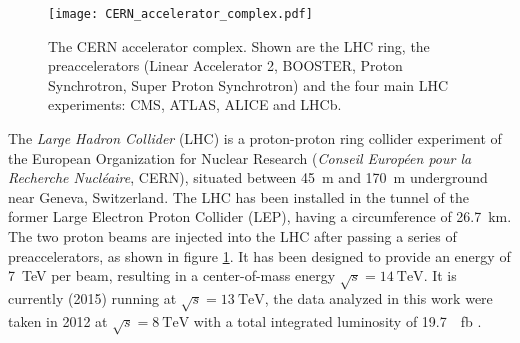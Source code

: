 \begin{figure}
	\centering
	\texttt{[image: CERN\_accelerator\_complex.pdf]}
	\caption{The CERN accelerator complex\cite[modified]{Marcastel2013CERNs}. Shown are the LHC ring, the preaccelerators (Linear Accelerator 2, BOOSTER, Proton Synchrotron, Super Proton Synchrotron) and the four main LHC experiments: CMS, ATLAS, ALICE and LHCb.}
	\label{fig:cern_accelerator_complex}
\end{figure}

The \emph{Large Hadron Collider} (LHC) is a proton-proton ring collider experiment of the European Organization for Nuclear Research (\emph{Conseil Européen pour la Recherche Nucléaire}, CERN), situated between \SI{45}{\meter} and \SI{170}{\meter} underground near Geneva, Switzerland. The LHC has been installed in the tunnel of the former Large Electron Proton Collider (LEP), having a circumference of \SI{26.7}{\kilo\meter}\cite{BV2009CERN,EB2008LHC}. The two proton beams are injected into the LHC after passing a series of preaccelerators, as shown in figure \ref{fig:cern_accelerator_complex}. It has been designed to provide an energy of \SI{7}{\TeV} per beam, resulting in a center-of-mass energy $\sqrt{s} = \SI{14}{\TeV}$. It is currently (2015) running at $\sqrt{s} = \SI{13}{\TeV}$, the data analyzed in this work were taken in 2012 at $\sqrt{s} = \SI{8}{\TeV}$ with a total integrated luminosity of \SI{19.7}{\per\femto\barn} \cite{DHK+2014MUSiC}.

